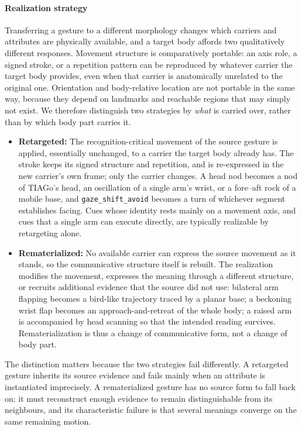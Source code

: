 
\paragraph{Realization strategy}
Transferring a gesture to a different morphology changes which carriers and attributes are physically available, and a target body affords two qualitatively different responses. Movement structure is comparatively portable: an axis role, a signed stroke, or a repetition pattern can be reproduced by whatever carrier the target body provides, even when that carrier is anatomically unrelated to the original one. Orientation and body-relative location are not portable in the same way, because they depend on landmarks and reachable regions that may simply not exist. We therefore distinguish two strategies by \emph{what} is carried over, rather than by which body part carries it.

\begin{itemize}
\item \textbf{Retargeted:} The recognition-critical movement of the source gesture is applied, essentially unchanged, to a carrier the target body already has. The stroke keeps its signed structure and repetition, and is re-expressed in the new carrier's own frame; only the carrier changes. A head nod becomes a nod of TIAGo's head, an oscillation of a single arm's wrist, or a fore--aft rock of a mobile base, and \texttt{gaze\_shift\_avoid} becomes a turn of whichever segment establishes facing. Cues whose identity rests mainly on a movement axis, and cues that a single arm can execute directly, are typically realizable by retargeting alone.

\item \textbf{Rematerialized:} No available carrier can express the source movement as it stands, so the communicative structure itself is rebuilt. The realization modifies the movement, expresses the meaning through a different structure, or recruits additional evidence that the source did not use: bilateral arm flapping becomes a bird-like trajectory traced by a planar base; a beckoning wrist flap becomes an approach-and-retreat of the whole body; a raised arm is accompanied by head scanning so that the intended reading survives. Rematerialization is thus a change of communicative form, not a change of body part.
\end{itemize}

The distinction matters because the two strategies fail differently. A retargeted gesture inherits its source evidence and fails mainly when an attribute is instantiated imprecisely. A rematerialized gesture has no source form to fall back on: it must reconstruct enough evidence to remain distinguishable from its neighbours, and its characteristic failure is that several meanings converge on the same remaining motion.
